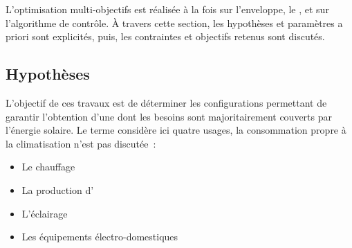 
L’optimisation multi-objectifs est réalisée à la fois sur l’enveloppe, le ,
et sur l’algorithme de contrôle.
À travers cette section, les hypothèses et paramètres a priori sont explicités, puis, les
contraintes et objectifs retenus sont discutés.


\subsection{Hypothèses} %
\label{sub:hypotheses_optimization}
L’objectif de ces travaux est de déterminer les configurations permettant
de garantir l’obtention d’une  dont les besoins sont majoritairement couverts
par l’énergie solaire. Le terme  considère ici quatre usages, la consommation
propre à la climatisation n’est pas discutée~:
\begin{itemize}
  \item Le chauffage
  \item La production d’
  \item L’éclairage
  \item Les équipements électro-domestiques
\end{itemize}

